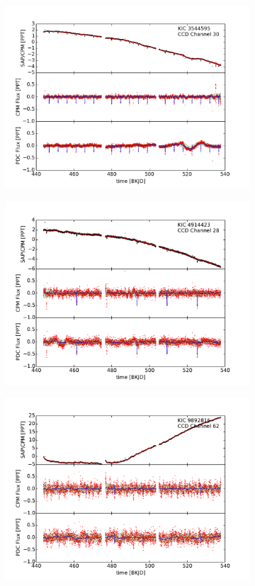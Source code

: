 \documentclass[12pt, preprint]{aastex}
\begin{document}
\begin{figure}[htb]
\begin{subfigure}[htb]{0.33\textwidth}
\includegraphics[width=\textwidth]{kic_3544595_pdc}
\end{subfigure}%
\hfill
\begin{subfigure}[htb]{0.33\textwidth}
\includegraphics[width=\textwidth]{kic_4914423_pdc}
\end{subfigure}%
\hfill
\begin{subfigure}[htb]{0.33\textwidth}
\includegraphics[width=\textwidth]{kic_9892816_pdc}

\end{subfigure}
\end{figure}
\end{document}
